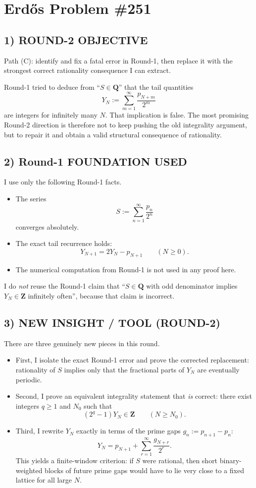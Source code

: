 \section{Erd\H{o}s Problem \#251}

\subsection*{1) ROUND-2 OBJECTIVE}
Path (C): identify and fix a fatal error in Round-1, then replace it with the strongest correct rationality consequence I can extract.

Round-1 tried to deduce from ``$S\in \mathbf{Q}$'' that the tail quantities
\[
Y_N:=\sum_{m=1}^{\infty}\frac{p_{N+m}}{2^m}
\]
are integers for infinitely many $N$. That implication is false. The most promising Round-2 direction is therefore not to keep pushing the old integrality argument, but to repair it and obtain a valid structural consequence of rationality.

\subsection*{2) Round-1 FOUNDATION USED}
I use only the following Round-1 facts.

\begin{itemize}
\item The series
\[
S:=\sum_{n=1}^{\infty}\frac{p_n}{2^n}
\]
converges absolutely.
\item The exact tail recurrence holds:
\[
Y_{N+1}=2Y_N-p_{N+1}\qquad (N\ge 0).
\]
\item The numerical computation from Round-1 is not used in any proof here.
\end{itemize}

I do \emph{not} reuse the Round-1 claim that ``$S\in\mathbf{Q}$ with odd denominator implies $Y_N\in\mathbf{Z}$ infinitely often'', because that claim is incorrect.

\subsection*{3) NEW INSIGHT / TOOL (ROUND-2)}
There are three genuinely new pieces in this round.

\begin{itemize}
\item First, I isolate the exact Round-1 error and prove the corrected replacement: rationality of $S$ implies only that the fractional parts of $Y_N$ are eventually periodic.
\item Second, I prove an equivalent integrality statement that \emph{is} correct:
there exist integers $q\ge 1$ and $N_0$ such that
\[
(2^q-1)Y_N\in \mathbf{Z}\qquad (N\ge N_0).
\]
\item Third, I rewrite $Y_N$ exactly in terms of the prime gaps $g_n:=p_{n+1}-p_n$:
\[
Y_N=p_{N+1}+\sum_{r=1}^{\infty}\frac{g_{N+r}}{2^r}.
\]
This yields a finite-window criterion: if $S$ were rational, then short binary-weighted blocks of future prime gaps would have to lie very close to a fixed lattice for all large $N$.
\end{itemize}

